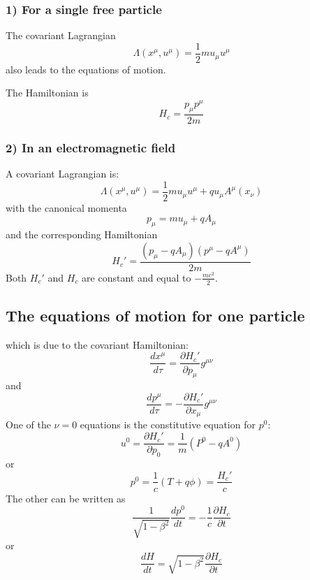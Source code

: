 \documentclass[12pt]{article}
\begin{document}
	\subsubsection*{1) For a single free particle}
	The covariant Lagrangian
	\begin{equation}
		\Lambda(x^\mu, u^\mu) = \frac{1}{2} m u_\mu u^\mu
	\end{equation}
	also leads to the equations of motion.
	
	The Hamiltonian is
	\begin{equation}
		H_c = \frac{p_\mu p^\mu}{2m}
	\end{equation}
	
	\subsubsection*{2) In an electromagnetic field}
	A covariant Lagrangian is:
	\begin{equation}
		\Lambda(x^\mu, u^\mu) = \frac{1}{2} m u_\mu u^\mu + q u_\mu A^\mu(x_\nu)
	\end{equation}
	with the canonical momenta
	\begin{equation}
		p_\mu = m u_\mu + q A_\mu
	\end{equation}
	and the corresponding Hamiltonian
	\begin{equation}
		H_c' = \frac{(p_\mu - qA_\mu)(p^\mu - qA^\mu)}{2m}
	\end{equation}
	Both $H_c'$ and $H_c$ are constant and equal to $-\frac{mc^2}{2}$.
	
	\subsection*{The equations of motion for one particle}
	which is due to the covariant Hamiltonian:
	\begin{equation}
		\frac{dx^\mu}{d\tau} = \frac{\partial H_c'}{\partial p_\mu} g^{\mu\nu}
	\end{equation}
	and
	\begin{equation}
		\frac{dp^\mu}{d\tau} = -\frac{\partial H_c'}{\partial x_\mu} g^{\mu\nu}
	\end{equation}
	One of the $\nu=0$ equations is the constitutive equation for $p^0$:
	\begin{equation}
		u^0 = \frac{\partial H_c'}{\partial p_0} = \frac{1}{m}(P^0 - qA^0)
	\end{equation}
	or
	\begin{equation}
		p^0 = \frac{1}{c}(T+q\phi) = \frac{H_c'}{c}
	\end{equation}
	The other can be written as
	\begin{equation}
		\frac{1}{\sqrt{1-\beta^2}}\frac{dp^0}{dt} = -\frac{1}{c}\frac{\partial H_c}{\partial t}
	\end{equation}
	or
	\begin{equation}
		\frac{dH}{dt} = \sqrt{1-\beta^2} \frac{\partial H_c}{\partial t}
	\end{equation}
\end{document}
